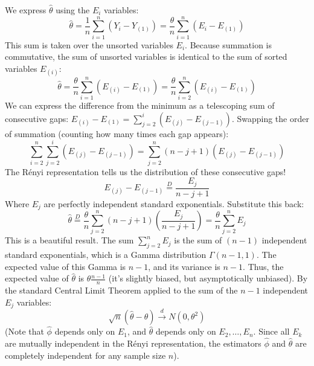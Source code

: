 \begin{solution}
We express $\hat{\theta}$ using the $E_i$ variables:
\[ \hat{\theta} = \frac{1}{n} \sum_{i=1}^n (Y_i - Y_{(1)}) = \frac{\theta}{n} \sum_{i=1}^n (E_i - E_{(1)}) \]
This sum is taken over the unsorted variables $E_i$. Because summation is commutative, the sum of unsorted variables is identical to the sum of sorted variables $E_{(i)}$:
\[ \hat{\theta} = \frac{\theta}{n} \sum_{i=1}^n (E_{(i)} - E_{(1)}) = \frac{\theta}{n} \sum_{i=2}^n (E_{(i)} - E_{(1)}) \]
We can express the difference from the minimum as a telescoping sum of consecutive gaps: $E_{(i)} - E_{(1)} = \sum_{j=2}^i (E_{(j)} - E_{(j-1)})$.
Swapping the order of summation (counting how many times each gap appears):
\[ \sum_{i=2}^n \sum_{j=2}^i (E_{(j)} - E_{(j-1)}) = \sum_{j=2}^n (n - j + 1) (E_{(j)} - E_{(j-1)}) \]
The Rényi representation tells us the distribution of these consecutive gaps!
\[ E_{(j)} - E_{(j-1)} \stackrel{D}{=} \frac{E_j}{n - j + 1} \]
Where $E_j$ are perfectly independent standard exponentials. Substitute this back:
\[ \hat{\theta} \stackrel{D}{=} \frac{\theta}{n} \sum_{j=2}^n (n - j + 1) \left( \frac{E_j}{n - j + 1} \right) = \frac{\theta}{n} \sum_{j=2}^n E_j \]
This is a beautiful result. The sum $\sum_{j=2}^n E_j$ is the sum of $(n-1)$ independent standard exponentials, which is a Gamma distribution $\Gamma(n-1, 1)$.
The expected value of this Gamma is $n-1$, and its variance is $n-1$.
Thus, the expected value of $\hat{\theta}$ is $\theta \frac{n-1}{n}$ (it's slightly biased, but asymptotically unbiased).
By the standard Central Limit Theorem applied to the sum of the $n-1$ independent $E_j$ variables:
\[ \sqrt{n}(\hat{\theta} - \theta) \xrightarrow{d} N(0, \theta^2) \]
(Note that $\hat{\phi}$ depends only on $E_1$, and $\hat{\theta}$ depends only on $E_2, \dots, E_n$. Since all $E_k$ are mutually independent in the Rényi representation, the estimators $\hat{\phi}$ and $\hat{\theta}$ are completely independent for any sample size $n$).
\end{solution}
